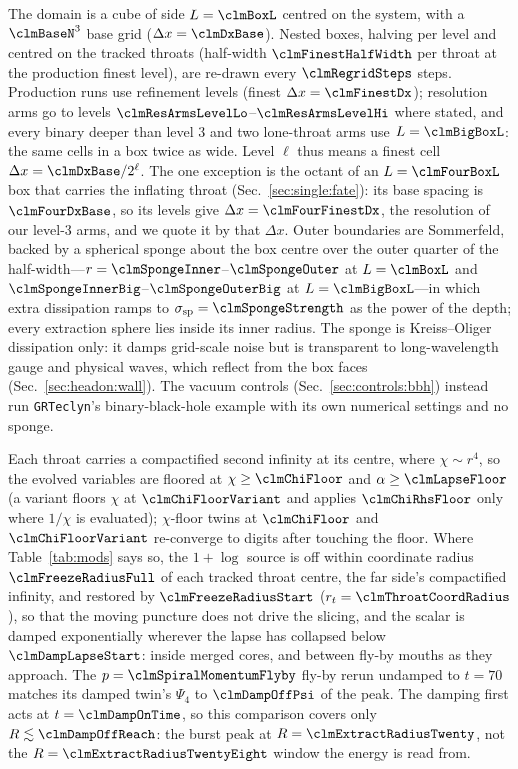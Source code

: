 \documentclass[twocolumn,floatfix,aps,prd,superscriptaddress,nofootinbib]{revtex4-2}
\begin{document}
The domain is a cube of side $L=\clmBoxL$ centred on the system, with a $\clmBaseN^3$ base grid ($\Delta x=\clmDxBase$). Nested boxes, halving per level and centred on the tracked throats (half-width $\clmFinestHalfWidth$ per throat at the production finest level), are re-drawn every $\clmRegridSteps$ steps. Production runs use \clmProdLevels{} refinement levels (finest $\Delta x=\clmFinestDx$); resolution arms go to levels $\clmResArmsLevelLo$--$\clmResArmsLevelHi$ where stated, and every binary deeper than level 3 and two lone-throat arms use $L=\clmBigBoxL$: the same cells in a box twice as wide. Level $\ell$ thus means a finest cell $\Delta x=\clmDxBase/2^\ell$. The one exception is the octant of an $L=\clmFourBoxL$ box that carries the inflating throat (Sec.~\ref{sec:single:fate}): its base spacing is $\clmFourDxBase$, so its \clmFourLevel{} levels give $\Delta x=\clmFourFinestDx$, the resolution of our level-3 arms, and we quote it by that $\Delta x$. Outer boundaries are Sommerfeld, backed by a spherical sponge about the box centre over the outer quarter of the half-width---$r=\clmSpongeInner$--$\clmSpongeOuter$ at $L=\clmBoxL$ and $\clmSpongeInnerBig$--$\clmSpongeOuterBig$ at $L=\clmBigBoxL$---in which extra dissipation ramps to $\sigma_{\rm sp}=\clmSpongeStrength$ as the \clmSpongePower{} power of the depth; every extraction sphere lies inside its inner radius. The sponge is Kreiss--Oliger dissipation only: it damps grid-scale noise but is transparent to long-wavelength gauge and physical waves, which reflect from the box faces (Sec.~\ref{sec:headon:wall}). The vacuum controls (Sec.~\ref{sec:controls:bbh}) instead run \texttt{GRTeclyn}'s binary-black-hole example with its own numerical settings and no sponge.

Each throat carries a compactified second infinity at its centre, where $\chi\sim r^4$, so the evolved variables are floored at $\chi\ge\clmChiFloor$ and $\alpha\ge\clmLapseFloor$ (a variant floors $\chi$ at $\clmChiFloorVariant$ and applies $\clmChiRhsFloor$ only where $1/\chi$ is evaluated); $\chi$-floor twins at $\clmChiFloor$ and $\clmChiFloorVariant$ re-converge to \clmControlChiDigits{} digits after touching the floor. Where Table~\ref{tab:mods} says so, the $1{+}\log$ source is off within coordinate radius $\clmFreezeRadiusFull$ of each tracked throat centre, the far side's compactified infinity, and restored by $\clmFreezeRadiusStart$ ($r_t=\clmThroatCoordRadius$), so that the moving puncture does not drive the slicing, and the scalar is damped exponentially wherever the lapse has collapsed below $\clmDampLapseStart$: inside merged cores, and between fly-by mouths as they approach. The $p=\clmSpiralMomentumFlyby$ fly-by rerun undamped to $t=70$ matches its damped twin's $\Psi_4$ to $\clmDampOffPsi$ of the peak. The damping first acts at $t=\clmDampOnTime$, so this comparison covers only $R\lesssim\clmDampOffReach$: the burst peak at $R=\clmExtractRadiusTwenty$, not the $R=\clmExtractRadiusTwentyEight$ window the energy is read from.
\end{document}
